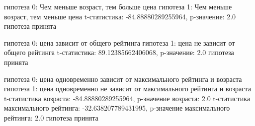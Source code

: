 \documentclass{article}
\begin{document}
гипотеза 0: Чем меньше возраст, тем больше цена\newline
гипотеза 1: Чем меньше возраст, тем меньше цена\newline
t-статистика: -84.88880289255964, p-значение: 2.0 гипотеза принята\newline
\newline

гипотеза 0: цена зависит от общего рейтинга\newline
гипотеза 1: цена не зависит от общего рейтинга\newline
t-статистика: 89.12385662406068, p-значение: 2.0 гипотеза принята\newline
\newline

гипотеза 0: цена одновременно зависит от максимального рейтинга и возраста\newline
гипотеза 1: цена одновременно не зависит от максимального рейтинга и возраста\newline
t-статистика возраста: -84.88880289255964, p-значение возраста: 2.0\newline
t-статистика максимального рейтинга: -32.638207789431995, p-значение максимального рейтинга: 2.0 гипотеза принята\newline
\end{document}

